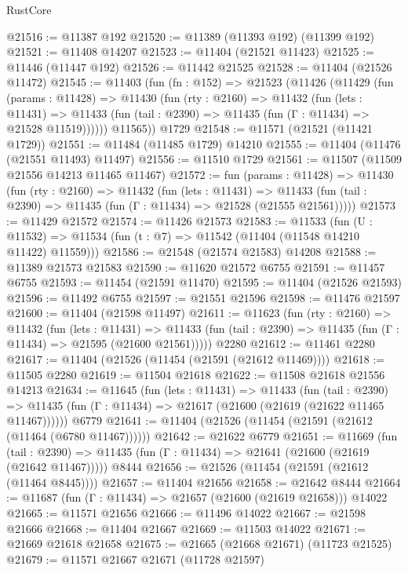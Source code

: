 \begin{lexlean}{RustCore}
\begin{coremodule}
@21516 := @11387 @192
@21520 := @11389 (@11393 @192) (@11399 @192)
@21521 := @11408 @14207
@21523 := @11404 (@21521 @11423)
@21525 := @11446 (@11447 @192)
@21526 := @11442 @21525
@21528 := @11404 (@21526 @11472)
@21545 := @11403
    (fun (fn : @152) =>
    @21523
      (@11426
        (@11429
          (fun (params : @11428) =>
          @11430
            (fun (rty : @2160) =>
            @11432
              (fun (lets : @11431) =>
              @11433 (fun (tail : @2390) => @11435 (fun (Γ : @11434) => @21528 @11519))))))
        @11565))
    @1729
@21548 := @11571 (@21521 (@11421 @1729))
@21551 := @11484 (@11485 @1729) @14210
@21555 := @11404 (@11476 (@21551 @11493) @11497)
@21556 := @11510 @1729
@21561 := @11507 (@11509 @21556 @14213 @11465 @11467)
@21572 := fun (params : @11428) =>
  @11430
    (fun (rty : @2160) =>
    @11432
      (fun (lets : @11431) =>
      @11433 (fun (tail : @2390) => @11435 (fun (Γ : @11434) => @21528 (@21555 @21561)))))
@21573 := @11429 @21572
@21574 := @11426 @21573
@21583 := @11533
    (fun (U : @11532) => @11534 (fun (t : @7) => @11542 (@11404 (@11548 @14210 @11422) @11559)))
@21586 := @21548 (@21574 @21583) @14208
@21588 := @11389 @21573 @21583
@21590 := @11620 @21572 @6755
@21591 := @11457 @6755
@21593 := @11454 (@21591 @11470)
@21595 := @11404 (@21526 @21593)
@21596 := @11492 @6755
@21597 := @21551 @21596
@21598 := @11476 @21597
@21600 := @11404 (@21598 @11497)
@21611 := @11623
    (fun (rty : @2160) =>
    @11432
      (fun (lets : @11431) =>
      @11433 (fun (tail : @2390) => @11435 (fun (Γ : @11434) => @21595 (@21600 @21561)))))
    @2280
@21612 := @11461 @2280
@21617 := @11404 (@21526 (@11454 (@21591 (@21612 @11469))))
@21618 := @11505 @2280
@21619 := @11504 @21618
@21622 := @11508 @21618 @21556 @14213
@21634 := @11645
    (fun (lets : @11431) =>
    @11433
      (fun (tail : @2390) =>
      @11435 (fun (Γ : @11434) => @21617 (@21600 (@21619 (@21622 @11465 @11467))))))
    @6779
@21641 := @11404 (@21526 (@11454 (@21591 (@21612 (@11464 (@6780 @11467))))))
@21642 := @21622 @6779
@21651 := @11669
    (fun (tail : @2390) => @11435 (fun (Γ : @11434) => @21641 (@21600 (@21619 (@21642 @11467)))))
    @8444
@21656 := @21526 (@11454 (@21591 (@21612 (@11464 @8445))))
@21657 := @11404 @21656
@21658 := @21642 @8444
@21664 := @11687 (fun (Γ : @11434) => @21657 (@21600 (@21619 @21658))) @14022
@21665 := @11571 @21656
@21666 := @11496 @14022
@21667 := @21598 @21666
@21668 := @11404 @21667
@21669 := @11503 @14022
@21671 := @21669 @21618 @21658
@21675 := @21665 (@21668 @21671) (@11723 @21525)
@21679 := @11571 @21667 @21671 (@11728 @21597)

\end{coremodule}
\end{lexlean}

